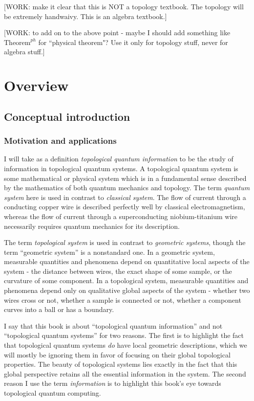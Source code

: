 \documentclass{article}
\theoremstyle{definition}
\numberwithin{figure}{section}
\begin{document}
[WORK: make it clear that this is NOT a topology textbook. The topology will be extremely handwaivy. This is an algebra textbook.]

[WORK: to add on to the above point - maybe I should add something like $\text{Theorem}^{ph}$ for ``physical theorem"? Use it only for topology stuff, never for algebra stuff.]
\newpage

\section{Overview}
\label{overview}

\subsection{Conceptual introduction}
\label{conceptual introduction}

\subsubsection{Motivation and applications}

I will take as a definition \textit{topological quantum information} to be the study of information in topological quantum systems. A topological quantum system is some mathematical or physical system which is in a fundamental sense described by the mathematics of both quantum mechanics and topology. The term \textit{quantum system} here is used in contrast to \textit{classical system}. The flow of current through a conducting copper wire is described perfectly well by classical electromagnetism, whereas the flow of current through a superconducting niobium-titanium wire necessarily requires quantum mechanics for its description.

The term \textit{topological system} is used in contrast to \textit{geometric systems}, though the term “geometric system” is a nonstandard one. In a geometric system, measurable quantities and phenomena depend on quantitative local aspects of the system - the distance between wires, the exact shape of some sample, or the curvature of some component. In a topological system, measurable quantities and phenomena depend only on qualitative global aspects of the system - whether two wires cross or not, whether a sample is connected or not, whether a component curves into a ball or has a boundary.

I say that this book is about “topological quantum information” and not “topological quantum systems” for two reasons. The first is to highlight the fact that topological quantum systems \textit{do} have local geometric descriptions, which we will mostly be ignoring them in favor of focusing on their global topological properties. The beauty of topological systems lies exactly in the fact that this global perspective retains all the essential information in the system. The second reason I use the term \textit{information} is to highlight this book’s eye towards topological quantum computing. 
\end{document}
